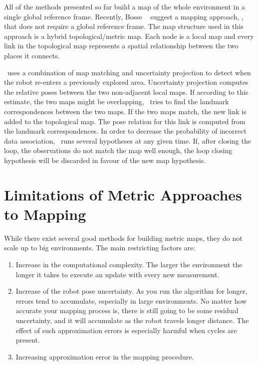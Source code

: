 All of the methods presented so far build a map of the whole
environment in a single global reference frame. Recently, Bosse \etal\
\cite{bosse03atlas} suggest a mapping approach, \Atlas, that does not
require a global reference frame. The map structure used in this
approach is a hybrid topological/metric map.  Each node is a local map
and every link in the topological map represents a spatial
relationship between the two places it connects. 

\Atlas\ uses a combination of map matching and uncertainty projection
to detect when the robot re-enters a previously explored area.
Uncertainty projection computes the relative poses between the two
non-adjacent local maps. If according to this estimate, the two maps
might be overlapping, \Atlas\ tries to find the landmark
correspondences between the two maps. If the two maps match, the new
link is added to the topological map. The pose relation for this link
is computed from the landmark correspondences. In order to decrease
the probability of incorrect data association, \Atlas\ runs several
hypotheses at any given time. If, after closing the loop, the
observations do not match the map well enough, the loop closing
hypothesis will be discarded in favour of the new map hypothesis.


\section{Limitations of Metric Approaches to Mapping}


While there exist several good methods for building metric maps, they
do not scale up to big environments. The main restricting factors are:

\begin{enumerate}
 \item Increase in the computational complexity. The larger the
  environment the longer it takes to execute an update with every new
  measurement.

 \item Increase of the robot pose uncertainty. As you run the
 algorithm for longer, errors tend to accumulate, especially in large
 environments. No matter how accurate your mapping process is,
 there is still going to be some residual uncertainty, and it will
 accumulate as the robot travels longer distance. The effect of such approximation
 errors is especially harmful when cycles are present.

 \item Increasing approximation error in the mapping procedure.

\end{enumerate}

